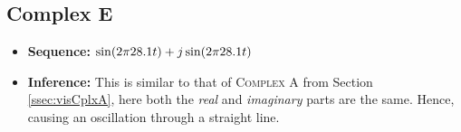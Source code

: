 \documentclass[../../course]{subfiles}
\begin{document}
\subsection{Complex E} \label{ssec:visCplxE}

\begin{itemize} [label=]

    \item \textbf{Sequence:} $\sin(2 \pi 28.1 t) + j \sin(2 \pi 28.1 t)$

    \item \textbf{Inference:} This is similar to that of \textsc{Complex A} from Section
        \ref{ssec:visCplxA}, here both the \emph{real} and \emph{imaginary} parts are the
        same. Hence, causing an oscillation through a straight line.

\end{itemize}

\vfill
\end{document}
